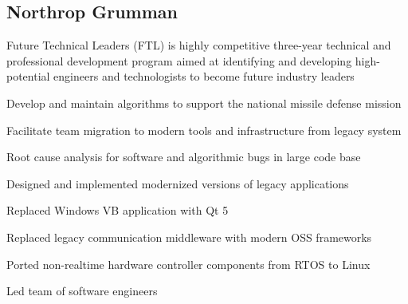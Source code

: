 \documentclass[letterpaper]{deedy-resume}
\newcommand{\experiencespace}{\vspace{2ex}}
\begin{document}
\begin{minipage}[t]{0.70\textwidth} %

    \subsection{Northrop Grumman}
    \vspace{1em}
    Future Technical Leaders (FTL) is highly competitive three-year technical and professional
        development program aimed at identifying and developing high-potential engineers and technologists to
        become future industry leaders 
    \experiencespace

    \begin{compactitem}
        \item Develop and maintain algorithms to support the national missile defense mission
        \item Facilitate team migration to modern tools and infrastructure from legacy system
        \item Root cause analysis for software and algorithmic bugs in large code base
    \end{compactitem}
    \experiencespace

    \begin{compactitem}
        \item Designed and implemented modernized versions of legacy applications
        \begin{compactitem}
            \item Replaced Windows VB application with Qt 5
            \item Replaced legacy communication middleware with modern OSS frameworks
            \item Ported non-realtime hardware controller components from RTOS to Linux
        \end{compactitem}
    \item Led team of software engineers
    \end{compactitem}
    \experiencespace


\end{minipage}
\end{document}
